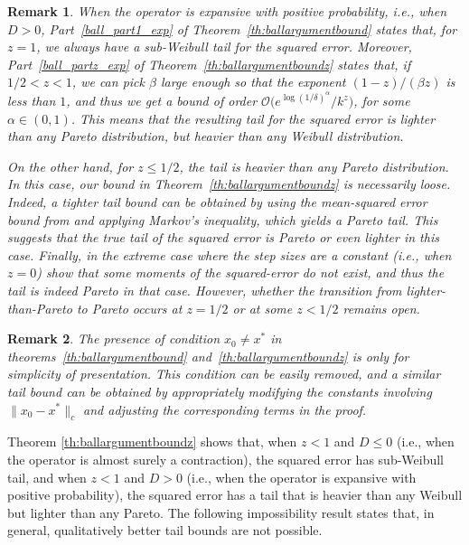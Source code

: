 \documentclass{article}
\newtheorem{remark}{Remark}
\begin{document}
\begin{remark}\label{rem:phasetransition}
    When the operator is expansive with positive probability, i.e., when $D > 0$,  Part~\ref{ball_part1_exp} of Theorem~\ref{th:ballargumentbound} states that, for $z=1$, we always have a sub-Weibull tail for the squared error. Moreover, Part~\ref{ball_partz_exp} of Theorem~\ref{th:ballargumentboundz} states that, if $1/2 < z < 1$, we can pick $\beta$ large enough so that the exponent $(1-z)/(\beta z)$ is less than $1$, and thus we get a bound of order $\mathcal{O}\big(e^{\log\left(1/\delta\right)^\alpha}/k^z\big)$, for some $\alpha \in (0,1)$. This means that the resulting tail for the squared error is lighter than any Pareto distribution, but heavier than any Weibull distribution. 
    
    On the other hand, for $z \le 1/2$, the tail is heavier than any Pareto distribution. In this case, our bound in Theorem~\ref{th:ballargumentboundz} is necessarily loose. Indeed, a tighter tail bound can be obtained by using the mean-squared error bound from \citet{chen2024lyapunov} and applying Markov's inequality, which yields a Pareto tail. This suggests that the true tail of the squared error is Pareto or even lighter in this case. Finally, in the extreme case where the step sizes are a constant (i.e., when $z=0$) \citet{srikant2019finite} show that some moments of the squared-error do not exist, and thus the tail is indeed Pareto in that case. However, whether the transition from lighter-than-Pareto to Pareto occurs at $z=1/2$ or at some $z < 1/2$ remains open. 
\end{remark}


\begin{remark}\label{rem:initialerror}
    The presence of condition $x_0 \ne x^*$ in theorems~\ref{th:ballargumentbound} and~\ref{th:ballargumentboundz} is only for simplicity of presentation. This condition can be easily removed, and a similar tail bound can be obtained by appropriately modifying the constants involving $\|x_0 - x^*\|_c$ and adjusting the corresponding terms in the proof.
\end{remark}



Theorem \ref{th:ballargumentboundz} shows that, when $z<1$ and $D \le 0$ (i.e., when the operator is almost surely a contraction), the squared error has sub-Weibull tail, and when $z<1$ and $D > 0$ (i.e., when the operator is expansive with positive probability), the squared error has a tail that is heavier than any Weibull but lighter than any Pareto. The following impossibility result states that, in general, qualitatively better tail bounds are not possible.
\end{document}
